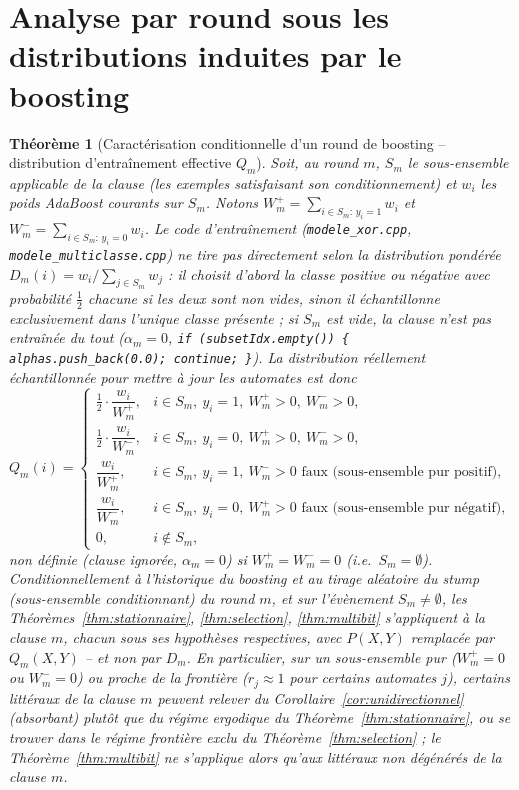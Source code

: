 \documentclass[12pt,a4paper]{article}
\newtheorem{theorem}{Théorème}[section]
\theoremstyle{remark}
\begin{document}
\section{Analyse par round sous les distributions induites par le boosting}

\begin{theorem}[Caractérisation conditionnelle d'un round de boosting -- distribution d'entraînement effective $Q_m$]\label{thm:boosting}
Soit, au round $m$, $S_m$ le sous-ensemble applicable de la clause (les
exemples satisfaisant son conditionnement) et $w_i$ les poids AdaBoost
courants sur $S_m$. Notons $W_m^+=\sum_{i\in S_m:\,y_i=1}w_i$ et
$W_m^-=\sum_{i\in S_m:\,y_i=0}w_i$. Le code d'entraînement
(\texttt{modele\_xor.cpp}, \texttt{modele\_multiclasse.cpp}) ne tire
\emph{pas} directement selon la distribution pondérée
$D_m(i)=w_i/\sum_{j\in S_m}w_j$ : il choisit d'abord la classe positive ou
négative avec probabilité $\tfrac12$ chacune \emph{si les deux sont non vides},
sinon il échantillonne exclusivement dans l'unique classe présente ; si $S_m$
est vide, la clause n'est pas entraînée du tout ($\alpha_m=0$,
\texttt{if (subsetIdx.empty()) \{ alphas.push\_back(0.0); continue; \}}). La
distribution réellement échantillonnée pour mettre à jour les automates est
donc
\[
  Q_m(i) = \begin{cases}
    \tfrac12\cdot\dfrac{w_i}{W_m^+}, & i\in S_m,\ y_i=1,\ W_m^+>0,\ W_m^->0,\\[2mm]
    \tfrac12\cdot\dfrac{w_i}{W_m^-}, & i\in S_m,\ y_i=0,\ W_m^+>0,\ W_m^->0,\\[2mm]
    \dfrac{w_i}{W_m^+}, & i\in S_m,\ y_i=1,\ W_m^->0 \text{ faux (sous-ensemble pur positif)},\\[2mm]
    \dfrac{w_i}{W_m^-}, & i\in S_m,\ y_i=0,\ W_m^+>0 \text{ faux (sous-ensemble pur négatif)},\\[2mm]
    0, & i\notin S_m,
  \end{cases}
\]
non définie (clause ignorée, $\alpha_m=0$) si $W_m^+=W_m^-=0$ (i.e.\ $S_m=\emptyset$).
Conditionnellement à l'historique du boosting et au tirage aléatoire du stump
(sous-ensemble conditionnant) du round $m$, et sur l'évènement $S_m\ne\emptyset$,
les Théorèmes~\ref{thm:stationnaire}, \ref{thm:selection}, \ref{thm:multibit}
s'appliquent à la clause $m$, \emph{chacun sous ses hypothèses respectives},
avec $P(X,Y)$ remplacée par $Q_m(X,Y)$ -- \emph{et non} par $D_m$. En
particulier, sur un sous-ensemble pur ($W_m^+=0$ ou $W_m^-=0$) ou
proche de la frontière ($r_j\approx1$ pour certains automates $j$), certains
littéraux de la clause $m$ peuvent relever du Corollaire~\ref{cor:unidirectionnel}
(absorbant) plutôt que du régime ergodique du Théorème~\ref{thm:stationnaire},
ou se trouver dans le régime frontière exclu du Théorème~\ref{thm:selection} ;
le Théorème~\ref{thm:multibit} ne s'applique alors qu'aux littéraux non
dégénérés de la clause $m$.
\end{theorem}
\end{document}
